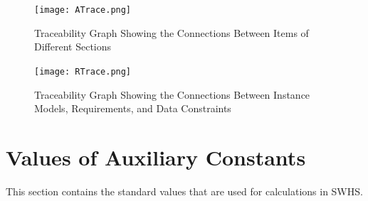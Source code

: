 \documentclass[12pt]{article}
\begin{document}
\begin{figure}
\begin{center}
\texttt{[image: ATrace.png]}
\caption{Traceability Graph Showing the Connections Between Items of Different Sections}
\label{Figure:TraceyA}
\end{center}
\end{figure}
\begin{figure}
\begin{center}
\texttt{[image: RTrace.png]}
\caption{Traceability Graph Showing the Connections Between Instance Models, Requirements, and Data Constraints}
\label{Figure:TraceyR}
\end{center}
\end{figure}
\section{Values of Auxiliary Constants}
\label{Sec:AuxConstants}
This section contains the standard values that are used for calculations in SWHS.
\end{document}

